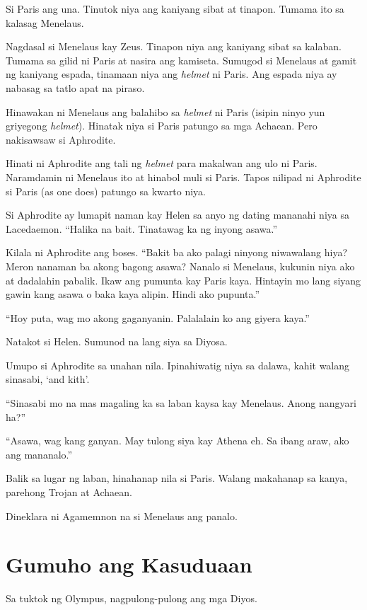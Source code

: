 \documentclass[12pt,letterpaper]{report}
\begin{document}
Si Paris ang una. Tinutok niya ang kaniyang sibat at tinapon. Tumama ito sa kalasag Menelaus.

Nagdasal si Menelaus kay Zeus. Tinapon niya ang kaniyang sibat sa kalaban. Tumama sa gilid ni Paris at nasira ang kamiseta. Sumugod si Menelaus at gamit ng kaniyang espada, tinamaan niya ang \textit{helmet} ni Paris. Ang espada niya ay nabasag sa tatlo apat na piraso.

Hinawakan ni Menelaus ang balahibo sa \textit{helmet} ni Paris (isipin ninyo yun griyegong \textit{helmet}). Hinatak niya si Paris patungo sa mga Achaean. Pero nakisawsaw si Aphrodite.

Hinati ni Aphrodite ang tali ng \textit{helmet} para makalwan ang ulo ni Paris. Naramdamin ni Menelaus ito at hinabol muli si Paris. Tapos nilipad ni Aphrodite si Paris (as one does) patungo sa kwarto niya.

Si Aphrodite ay lumapit naman kay Helen sa anyo ng dating mananahi niya sa Lacedaemon. ``Halika na bait. Tinatawag ka ng inyong asawa.''

Kilala ni Aphrodite ang boses. ``Bakit ba ako palagi ninyong niwawalang hiya? Meron nanaman ba akong bagong asawa? Nanalo si Menelaus, kukunin niya ako at dadalahin pabalik. Ikaw ang pumunta kay Paris kaya. Hintayin mo lang siyang gawin kang asawa o baka kaya alipin. Hindi ako pupunta.''

``Hoy puta, wag mo akong gaganyanin. Palalalain ko ang giyera kaya.''

Natakot si Helen. Sumunod na lang siya sa Diyosa.

Umupo si Aphrodite sa unahan nila. Ipinahiwatig niya sa dalawa, kahit walang sinasabi, `and kith'.

``Sinasabi mo na mas magaling ka sa laban kaysa kay Menelaus. Anong nangyari ha?''

``Asawa, wag kang ganyan. May tulong siya kay Athena eh. Sa ibang araw, ako ang mananalo.''

Balik sa lugar ng laban, hinahanap nila si Paris. Walang makahanap sa kanya, parehong Trojan at Achaean.

Dineklara ni Agamemnon na si Menelaus ang panalo.


\pagebreak
\chapter{Gumuho ang Kasuduaan} %

Sa tuktok ng Olympus, nagpulong-pulong ang mga Diyos.
\end{document}
